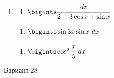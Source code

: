 \documentclass{article}
\begin{document}
\begin{multicols}{2}
\begin{enumerate}[label=\Roman*.]
		\item
		\begin{multicols}{3}
			\begin{enumerate}[label=\arabic*.]
				\setlength\itemsep{1em}
				\item $\bigints\cfrac{dx}{2-3\cos x + \sin x}$
			\end{enumerate}
			\vfill\null\columnbreak
			\begin{enumerate}[label=\arabic*., start=2]
				\setlength\itemsep{1em}
				\item $\bigints\sin 3x \sin x\ dx$
			\end{enumerate}
			\vfill\null\columnbreak
			\begin{enumerate}[label=\arabic*., start=3]
				\setlength\itemsep{1em}
				\item $\bigints\cos^2 \cfrac{x}{5}\ dx$
			\end{enumerate}
			\vfill\null\columnbreak
		\end{multicols}
	\end{enumerate}
	
	\vfill\null\columnbreak
	
	\centerline{Вариант 28}
	

\end{multicols}
\end{document}

